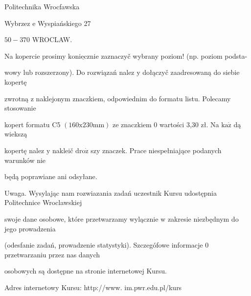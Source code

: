 \documentclass[a4paper,12pt]{article}
\begin{document}
Politechnika Wrocfawska

Wybrzez $\mathrm{e}$ Wyspiańskiego 27

$50-370$ WROCLAW.

Na kopercie prosimy $\underline{\mathrm{k}\mathrm{o}\mathrm{n}\mathrm{i}\mathrm{e}\mathrm{c}\mathrm{z}\mathrm{n}\mathrm{i}\mathrm{e}}$ zaznaczyč wybrany poziom! (np. poziom podsta-

wowy lub rozszerzony). Do rozwiązań nalez $\mathrm{y}$ dołączyč zaadresowaną do siebie kopertę

zwrotną $\mathrm{z}$ naklejonym znaczkiem, odpowiednim do formatu listu. Polecamy stosowanie

kopert formatu C5 $(160\mathrm{x}230\mathrm{m}\mathrm{m})$ ze znaczkiem $0$ wartości 3,30 zł. Na $\mathrm{k}\mathrm{a}\dot{\mathrm{z}}$ dą wiekszą

kopertę nalez $\mathrm{y}$ nakleič $\mathrm{d}\mathrm{r}\mathrm{o}\dot{\mathrm{z}}$ szy znaczek. Prace niespełniające podanych warunków nie

będą poprawiane ani odsyłane.

Uwaga. Wysylając nam rozwiazania zadań uczestnik Kursu udostępnia Politechnice Wroclawskiej

swoje dane osobowe, które przetwarzamy wylącznie $\mathrm{w}$ zakresie niezbędnym do jego prowadzenia

(odesfanie zadań, prowadzenie statystyki). Szczegófowe informacje $0$ przetwarzaniu przez nas danych

osobowych są dostępne na stronie internetowej Kursu.

Adres internetowy Kursu: http://www. im.pwr.edu.pl/kurs
\end{document}
